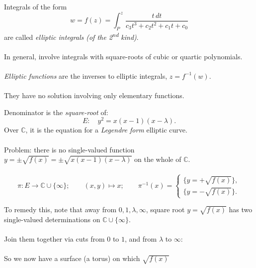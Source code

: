 \documentclass{beamer}
\begin{document}
\begin{frame}
	Integrals of the form
	\begin{equation*}
		w = f(z) = \int_{P}^{z} \frac{t\, dt}{c_{3}t^{3} + c_{2}t^{2} + c_{1}t + c_{0}}
	\end{equation*}
	are called \emph{elliptic integrals (of the 2\textsuperscript{nd} kind)}. \\~\\
	
	In general, involve integrals with square-roots of cubic or quartic polynomials. \\~\\
	
	\emph{Elliptic functions} are the inverses to elliptic integrals, $z = f^{-1}(w)$. \\~\\
		
	They have no solution involving only elementary functions.
\end{frame}

\begin{frame}
	Denominator is the \emph{square-root} of:
	\begin{equation*}
		E: \quad y^{2} = x(x-1)(x-\lambda).
	\end{equation*}
	Over $\mathbb{C}$, it is the equation for a \emph{Legendre form} elliptic curve. \\~\\
	
	Problem: there is no single-valued function $y = \pm\sqrt{f(x)} = \pm\sqrt{x(x-1)(x-\lambda)}$ on the whole of $\mathbb{C}$. \\~\\
	
	$$
		\pi : E \rightarrow \mathbb{C}\cup \{\infty\}; \qquad (x,y) \longmapsto x; \qquad \pi^{-1}(x) = \begin{cases}
		\big\{ y = + \sqrt{f(x)} \big\}, \\
		\big\{ y = - \sqrt{f(x)} \big\}.
		\end{cases}
	$$
\end{frame}
	
\begin{frame}
	To remedy this, note that away from $0, 1, \lambda, \infty$, square root $y = \sqrt{f(x)}$ has two single-valued determinations on $\mathbb{C} \cup \{\infty\}$. \\~\\
	
	Join them together via cuts from $0$ to $1$, and from $\lambda$ to $\infty$: \\~\\
	
	So we now have a surface (a torus) on which $\sqrt{f(x)}$ 
	
	
\end{frame}

\begin{frame}	
\end{frame}

\begin{frame}
\end{frame}

\begin{frame}
\end{frame}

\begin{frame}
\end{frame}

\begin{frame}
\end{frame}
\end{document}
